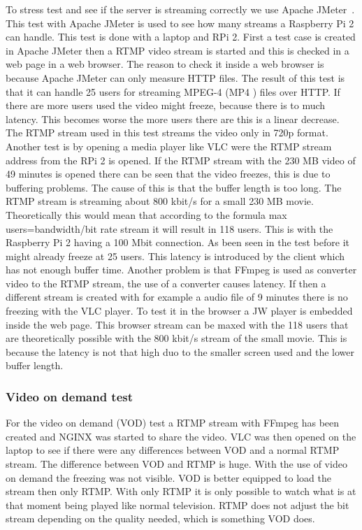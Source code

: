 \documentclass{sig-alternate-br}
\begin{document}
To stress test and see if the server is streaming correctly we use Apache JMeter~\cite{jmeter}. This test with Apache JMeter is used to see how many streams a Raspberry Pi 2 can handle. This test is done with a laptop and RPi 2. First a test case is created in Apache JMeter then a RTMP video stream is started and this is checked in a web page in a web browser. The reason to check it inside a web browser is because Apache JMeter can only measure HTTP files. The result of this test is that it can handle 25 users for streaming MPEG-4 (MP4 ) files over HTTP. If there are more users used the video might freeze, because there is to much latency. This becomes worse the more users there are this is a linear decrease. The RTMP stream used in this test streams the video only in 720p format. \newline Another test is by opening a media player like VLC were the RTMP stream address from the RPi 2 is opened. If the RTMP stream with the 230 MB video of 49 minutes is opened  there can be seen that the video freezes, this is due to buffering problems. The cause of this is that the buffer length is too long.  \newline
The RTMP stream is streaming about 800 kbit/s for a small 230 MB movie. Theoretically this would mean that according to the formula max users=bandwidth/bit rate stream it will result in 118 users. This is with the Raspberry Pi 2 having a 100 Mbit connection. As been seen in the test before it might already freeze at 25 users. This latency is introduced by the client which has not enough buffer time. Another problem is that FFmpeg is used as converter video to the RTMP stream, the use of a converter causes latency. \newline
If then a different stream is created with for example a audio file of 9 minutes there is no freezing with the VLC player. \newline To test it in the browser a JW player is embedded inside the web page. This browser stream can be maxed with the 118 users that are theoretically possible with the 800 kbit/s stream of the small movie. This is because the latency is not that high duo to the smaller screen used and the lower buffer length.
 

\subsubsection{Video on demand test}
For the video on demand (VOD) test a RTMP stream with FFmpeg has been created and NGINX was started to share the video. VLC was then opened on the laptop to see if there were any differences between VOD and a normal RTMP stream. The difference between VOD and RTMP is huge. With the use of video on demand the freezing was not visible. VOD is better equipped to load the stream then only RTMP. With only RTMP it is only possible to watch what is at that moment being played like normal television. RTMP does not adjust the bit stream depending on the quality needed, which is something VOD does.
\end{document}
